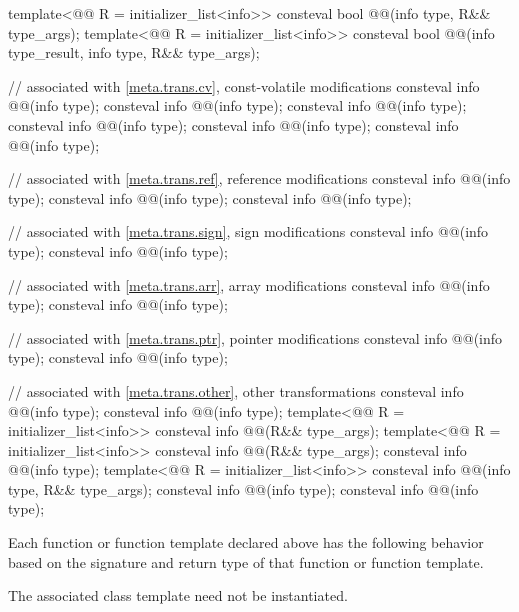 \begin{codeblock}
template<@@ R = initializer_list<info>>
  consteval bool @@(info type, R&& type_args);
template<@@ R = initializer_list<info>>
  consteval bool @@(info type_result, info type, R&& type_args);

// associated with \ref{meta.trans.cv}, const-volatile modifications
consteval info @@(info type);
consteval info @@(info type);
consteval info @@(info type);
consteval info @@(info type);
consteval info @@(info type);
consteval info @@(info type);

// associated with \ref{meta.trans.ref}, reference modifications
consteval info @@(info type);
consteval info @@(info type);
consteval info @@(info type);

// associated with \ref{meta.trans.sign}, sign modifications
consteval info @@(info type);
consteval info @@(info type);

// associated with \ref{meta.trans.arr}, array modifications
consteval info @@(info type);
consteval info @@(info type);

// associated with \ref{meta.trans.ptr}, pointer modifications
consteval info @@(info type);
consteval info @@(info type);

// associated with \ref{meta.trans.other}, other transformations
consteval info @@(info type);
consteval info @@(info type);
template<@@ R = initializer_list<info>>
  consteval info @@(R&& type_args);
template<@@ R = initializer_list<info>>
  consteval info @@(R&& type_args);
consteval info @@(info type);
template<@@ R = initializer_list<info>>
  consteval info @@(info type, R&& type_args);
consteval info @@(info type);
consteval info @@(info type);
\end{codeblock}

\pnum
Each function or function template declared above has the following behavior
based on the signature and return type of that function or function template.
\begin{note}
The associated class template need not be instantiated.
\end{note}

